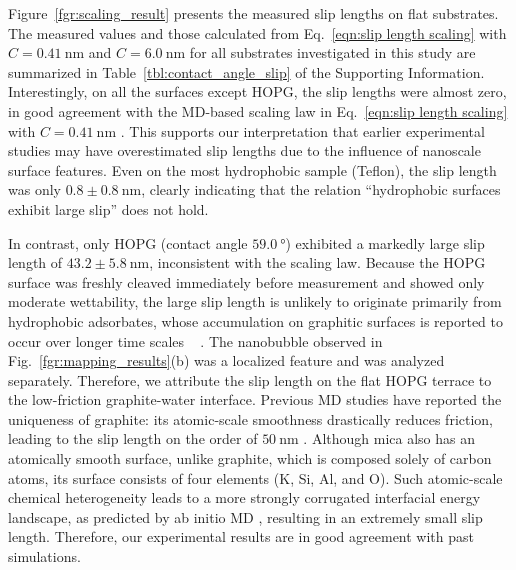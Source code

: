 \documentclass[journal=jacsat,manuscript=article]{achemso}
\providecommand{\DIFadd}[1]{{\protect\color{blue}#1}} %
\providecommand{\DIFdel}[1]{} %
\providecommand{\DIFaddbegin}{} %
\providecommand{\DIFaddend}{} %
\providecommand{\DIFdelbegin}{} %
\providecommand{\DIFdelend}{} %
\newcommand{\DIFaddincludegraphics}[2][]{{\color{blue}\DIFOincludegraphics[#1]{#2}}} %
\newcommand{\DIFdelincludegraphics}[2][]{} %
\DeclareRobustCommand{\DIFaddbegin}{\DIFOaddbegin \let\includegraphics\DIFaddincludegraphics} %
\DeclareRobustCommand{\DIFaddend}{\DIFOaddend \let\includegraphics\DIFOincludegraphics} %
\DeclareRobustCommand{\DIFdelbegin}{\DIFOdelbegin \let\includegraphics\DIFdelincludegraphics} %
\DeclareRobustCommand{\DIFdelend}{\DIFOaddend \let\includegraphics\DIFOincludegraphics} %
\begin{document}
Figure~\ref{fgr:scaling_result} presents the measured slip lengths on flat substrates. \DIFaddbegin \DIFadd{The measured values and those calculated from Eq.~\ref{eqn:slip length scaling} with \(C = \SI{0.41}{\nano\metre}\) and \(C = \SI{6.0}{\nano\metre}\) for all substrates investigated in this study are summarized in Table~\ref{tbl:contact_angle_slip} of the Supporting Information. }\DIFaddend Interestingly, on all the surfaces except HOPG, the slip lengths were almost zero, in good agreement with the MD-based scaling law in Eq.~\ref{eqn:slip length scaling} with \DIFdelbegin \DIFdel{\(C = 0.41\) }\DIFdelend \DIFaddbegin \DIFadd{\(C = \SI{0.41}{\nano\metre}\) }\DIFaddend \cite{Huang2008-xu}. This supports our interpretation that earlier experimental studies may have overestimated slip lengths due to the influence of nanoscale surface features. Even on the most hydrophobic sample (Teflon), the slip length was only \(0.8 \pm \SI{0.8}{\nano\metre}\), clearly indicating that the relation ``hydrophobic surfaces exhibit large slip'' does not hold.

In contrast, only HOPG (contact angle \(\SI{59.0}{\degree}\)) exhibited a markedly large slip length of \(43.2 \pm \SI{5.8}{\nano\metre}\), inconsistent with the scaling law. \DIFdelbegin \DIFdel{However, previous }\DIFdelend \DIFaddbegin \DIFadd{Because the HOPG surface was freshly cleaved immediately before measurement and showed only moderate wettability, the large slip length is unlikely to originate primarily from hydrophobic adsorbates, whose accumulation on graphitic surfaces is reported to occur over longer time scales \mbox{%
\cite{Kozbial2016-kk}}\hskip0pt%
. The nanobubble observed in Fig.~\ref{fgr:mapping_results}(b) was a localized feature and was analyzed separately. Therefore, we attribute the slip length on the flat HOPG terrace to the low-friction graphite-water interface. Previous }\DIFaddend MD studies have reported the uniqueness of graphite: its atomic-scale smoothness drastically reduces friction, leading to the slip length on the order of \(\SI{50}{\nano\metre}\) \cite{Wagemann2017-bk, Kannam2012-jx}. Although mica also has an atomically smooth surface, unlike graphite, which is composed solely of carbon atoms, its surface consists of four elements (K, Si, Al, and O). Such atomic-scale chemical heterogeneity leads to a more strongly corrugated interfacial energy landscape, as predicted by ab initio MD \cite{Tocci2014-es}, resulting in an extremely small slip length. Therefore, our experimental results are in good agreement with past simulations\DIFaddbegin \DIFadd{.
}
\end{document}
